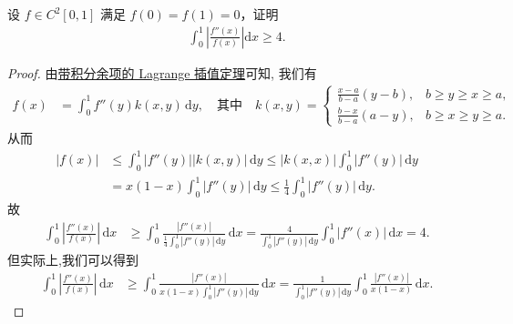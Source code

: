 \documentclass[../../main.tex]{subfiles}
\begin{document}
\begin{example}
设 $f \in C^2[0,1]$ 满足 $f(0) = f(1) = 0$，证明
\begin{align*}
\int_{0}^{1} \left| \frac{f''(x)}{f(x)} \right| \mathrm{d}x \geq 4.
\end{align*}
\end{example}
\begin{proof}
由\hyperref[theorem:带积分型余项的Lagrange插值公式]{带积分余项的 Lagrange 插值定理}可知, 我们有
\begin{align*}
f(x) &= \int_0^1 f''(y) k(x,y) \, \mathrm{d}y, \quad \text{其中} \quad k(x,y) = 
\begin{cases}
\frac{x-a}{b-a}(y-b), & b \ge y \ge x \ge a, \\
\frac{b-x}{b-a}(a-y), & b \ge x \ge y \ge a.
\end{cases}
\end{align*}
从而
\begin{align*}
|f(x)| &\leqslant \int_0^1 |f''(y)| |k(x,y)| \, \mathrm{d}y \leqslant |k(x,x)| \int_0^1 |f''(y)| \, \mathrm{d}y \\
&= x(1-x) \int_0^1 |f''(y)| \, \mathrm{d}y \leqslant \frac{1}{4} \int_0^1 |f''(y)| \, \mathrm{d}y.
\end{align*}
故
\begin{align*}
\int_0^1 \left| \frac{f''(x)}{f(x)} \right| \, \mathrm{d}x &\geqslant \int_0^1 \frac{|f''(x)|}{\frac{1}{4} \int_0^1 |f''(y)| \, \mathrm{d}y} \, \mathrm{d}x = \frac{4}{\int_0^1 |f''(y)| \, \mathrm{d}y} \int_0^1 |f''(x)| \, \mathrm{d}x = 4.
\end{align*}
但实际上,我们可以得到
\begin{align*}
\int_0^1 \left| \frac{f''(x)}{f(x)} \right| \, \mathrm{d}x &\geqslant \int_0^1 \frac{|f''(x)|}{x(1-x) \int_0^1 |f''(y)| \, \mathrm{d}y} \, \mathrm{d}x = \frac{1}{\int_0^1 |f''(y)| \, \mathrm{d}y} \int_0^1 \frac{|f''(x)|}{x(1-x)} \, \mathrm{d}x.
\end{align*}
\end{proof}
\end{document}
